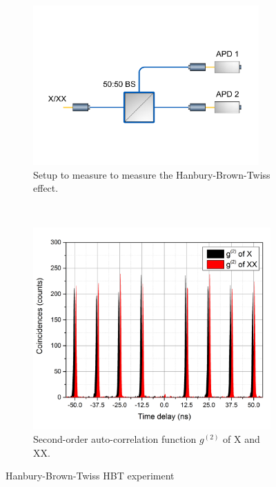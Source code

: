\begin{figure}[H]
	\centering
	\begin{subfigure}[b]{0.48\textwidth}
		\centering
		\includegraphics[width=0.95\textwidth]{figures/quantum-dot/HBT_Fiber.pdf}
		\caption{Setup to measure to measure the Hanbury-Brown-Twiss effect.}
		\label{fig:hbt-fiber}
	\end{subfigure}%
	~ %
	\begin{subfigure}[b]{0.48\textwidth}
		\centering
		\includegraphics[width=\textwidth]{figures/quantum-dot/G2_X_XX.png}
		\caption{Second-order auto-correlation function $g^{(2)}$ of \ac{X} and \ac{XX}.}
		\label{fig:gs2-x-xx}
	\end{subfigure}
	\caption{Hanbury-Brown-Twiss \acs{HBT} experiment~\cite{schimpf_towards_2017}}
	\label{fig:hbt}
\end{figure}
  

